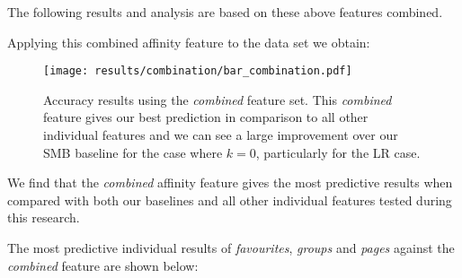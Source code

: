 The following results and analysis are based on these above features combined.

\clearpage

Applying this combined affinity feature to the data set we obtain:

\begin{figure}[h]
	\begin{center}
		\texttt{[image: results/combination/bar\_combination.pdf]}
		\caption{Accuracy results using the \emph{combined} feature set. This \emph{combined} feature gives our best prediction 
		in comparison to all other individual features and we can see a large improvement over our SMB baseline for the case where $k=0$, particularly for the LR case.}
	\end{center}
\end{figure}

\clearpage

We find that the \emph{combined} affinity feature gives the most predictive results when compared with both our baselines and all
other individual features tested during this research.

The most predictive individual results of \emph{favourites}, \emph{groups} and \emph{pages} against the \emph{combined}
feature are shown below:

